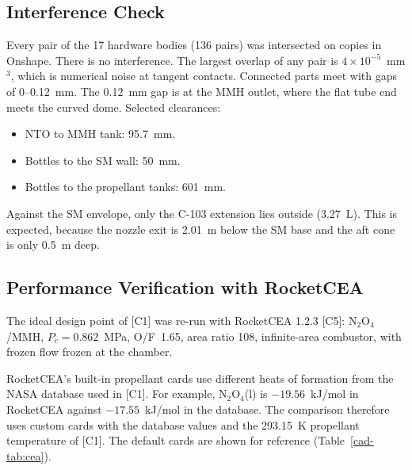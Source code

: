 \subsection{Interference Check}
Every pair of the 17 hardware bodies (136 pairs) was intersected on copies in Onshape. There is no interference. The
largest overlap of any pair is $4\times10^{-5}$~mm$^3$, which is numerical noise at tangent contacts. Connected parts
meet with gaps of 0--0.12~mm. The 0.12~mm gap is at the MMH outlet, where the flat tube end meets the curved dome.
Selected clearances:
\begin{itemize}
\item NTO to MMH tank: 95.7~mm.
\item Bottles to the SM wall: 50~mm.
\item Bottles to the propellant tanks: 601~mm.
\end{itemize}
Against the SM envelope, only the C-103 extension lies outside (3.27~L). This is expected, because the nozzle exit is
2.01~m below the SM base and the aft cone is only 0.5~m deep.

\subsection{Performance Verification with RocketCEA}\label{cad-sec:cea}
The ideal design point of [C1] was re-run with RocketCEA 1.2.3 [C5]: N$_2$O$_4$/MMH, $P_c = 0.862$~MPa, O/F~1.65, area
ratio 108, infinite-area combustor, with frozen flow frozen at the chamber.

RocketCEA's built-in propellant cards use different heats of formation from the NASA database used in [C1]. For example,
N$_2$O$_4$(l) is $-19.56$~kJ/mol in RocketCEA against $-17.55$~kJ/mol in the database. The comparison therefore uses
custom cards with the database values and the 293.15~K propellant temperature of [C1]. The default cards are shown for
reference (Table~\ref{cad-tab:cea}).

